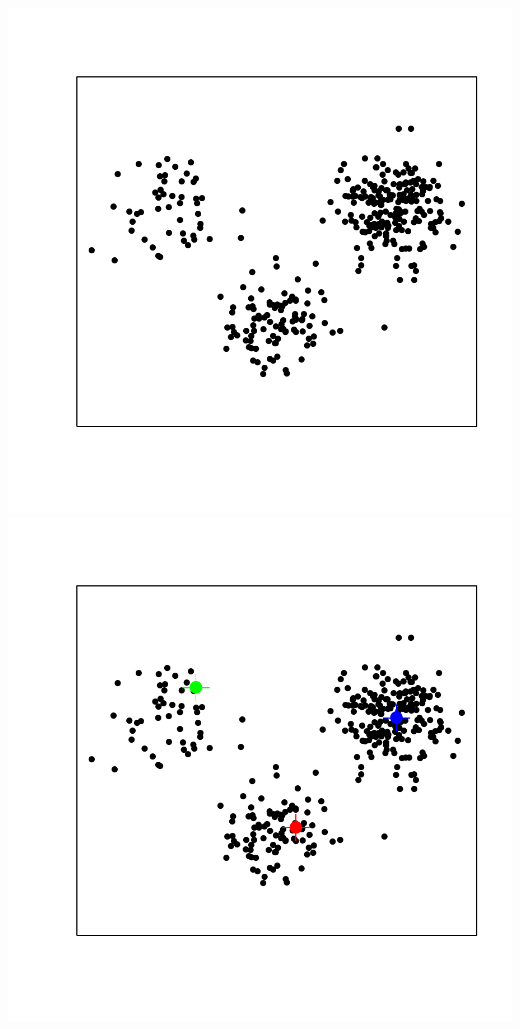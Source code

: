 \documentclass[landscape,footrule]{foils}
\begin{document}
\centerline{
\includegraphics[scale=0.6]{kmeans-1}\hspace*{-1.7cm}\includegraphics[scale=0.6]{kmeans-2}
\vspace*{-2.6cm}}
\end{document}
